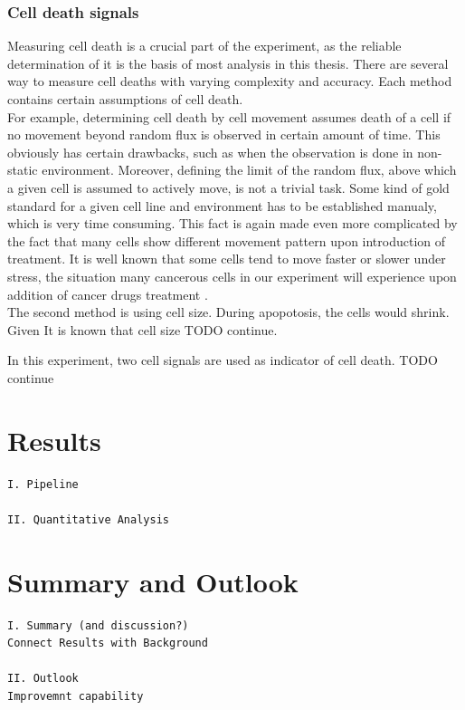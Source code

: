 \documentclass[pdftex,12pt,a4paper]{report}
\begin{document}
\subsection{Cell death signals}

Measuring cell death is a crucial part of the experiment, as the reliable determination of it is the basis of most analysis in this thesis. There are several way to measure cell deaths with varying complexity and accuracy. Each method contains certain assumptions of cell death.\\

For example, determining cell death by cell movement assumes death of a cell if no movement beyond random flux is observed in certain amount of time. This obviously has certain drawbacks, such as when the observation is done in non-static environment. Moreover, defining the limit of the random flux, above which a given cell is assumed to actively move, is not a trivial task. Some kind of gold standard for a given cell line and environment has to be established manualy, which is very time consuming. This fact is again made even more complicated by the fact that many cells show different movement pattern upon introduction of treatment. It is well known that some cells tend to move faster or slower under stress, the situation many cancerous cells in our experiment will experience upon addition of cancer drugs treatment \cite{pienta1991effects, fenteany2003small, ruocco2012suppressing}.\\

The second method is using cell size. During apopotosis, the cells would shrink. Given It is known that cell size TODO continue.

In this experiment, two cell signals are used as indicator of cell death. TODO continue


\chapter{Results}

\begin{verbatim}
I. Pipeline

II. Quantitative Analysis
\end{verbatim}

\chapter{Summary and Outlook}

\begin{verbatim}
I. Summary (and discussion?)
Connect Results with Background

II. Outlook
Improvemnt capability
\end{verbatim}
\end{document}
